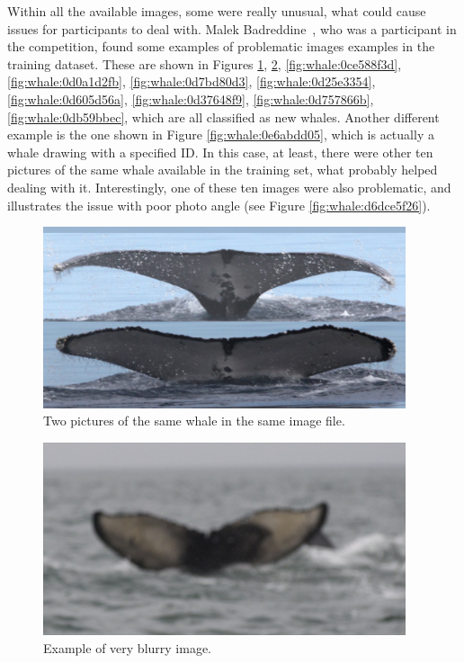 \documentclass[12pt,
    brazil,			%
	english,        %
	]{article}
\begin{document}
Within all the available images, some were really unusual, what could cause issues for participants to deal with. Malek Badreddine~\cite{badreddine2019bad}, who was a participant in the competition, found some examples of problematic images examples in the training dataset. These are shown in Figures \ref{fig:whale:0a5216ef5}, \ref{fig:whale:0c0bf8fb8}, \ref{fig:whale:0ce588f3d}, \ref{fig:whale:0d0a1d2fb}, \ref{fig:whale:0d7bd80d3}, \ref{fig:whale:0d25e3354}, \ref{fig:whale:0d605d56a}, \ref{fig:whale:0d37648f9}, \ref{fig:whale:0d757866b}, \ref{fig:whale:0db59bbec}, which are all classified as new whales. Another different example is the one shown in Figure \ref{fig:whale:0e6abdd05}, which is actually a whale drawing with a specified ID. In this case, at least, there were other ten pictures of the same whale available in the training set, what probably helped dealing with it. Interestingly, one of these ten images were also problematic, and illustrates the issue with poor photo angle (see Figure \ref{fig:whale:d6dce5f26}). %

\begin{figure}
    \centering
    \includegraphics[width=0.95\textwidth]{images/whales/0a5216ef5.jpg}
    \caption{Two pictures of the same whale in the same image file.}
    \label{fig:whale:0a5216ef5}
\end{figure}

\begin{figure}
    \centering
    \includegraphics[width=0.95\textwidth]{images/whales/0c0bf8fb8.jpg}
    \caption{Example of very blurry image.}
    \label{fig:whale:0c0bf8fb8}
\end{figure}
\end{document}

